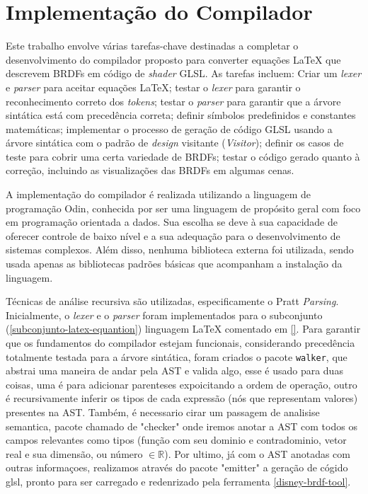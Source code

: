 \section{Implementação do Compilador} \label{compiladorimplementacao}
%
%


Este trabalho envolve várias tarefas-chave destinadas a completar o desenvolvimento do compilador proposto para converter equações \LaTeX{}  que descrevem BRDFs em código de \textit{shader} GLSL. As tarefas incluem: Criar um \textit{lexer} e \textit{parser} para aceitar equações \LaTeX{}; testar o \textit{lexer} para garantir o reconhecimento correto dos \textit{tokens}; testar o \textit{parser} para garantir que a árvore sintática está com precedência correta; definir símbolos predefinidos e constantes matemáticas; implementar o processo de geração de código GLSL usando a árvore sintática com o padrão de \textit{design} visitante (\textit{Visitor}); definir os casos de teste para cobrir uma certa variedade de BRDFs; testar o código gerado quanto à correção, incluindo as visualizações das BRDFs em algumas cenas.

A implementação do compilador é realizada utilizando a linguagem de programação Odin, conhecida por ser uma linguagem de propósito geral com foco em programação orientada a dados. Sua escolha se deve à sua capacidade de oferecer controle de baixo nível e a sua adequação para o desenvolvimento de sistemas complexos. Além disso, nenhuma biblioteca externa foi utilizada, sendo usada apenas as bibliotecas padrões básicas que acompanham a instalação da linguagem.

Técnicas de análise recursiva são utilizadas, especificamente o Pratt \textit{Parsing}. Inicialmente, o \textit{lexer} e o \textit{parser} foram implementados para o subconjunto (\autoref{subconjunto-latex-equantion}) linguagem \LaTeX{} comentado em \autoref{}. Para garantir que os fundamentos do compilador estejam funcionais, considerando precedência totalmente testada para a árvore sintática, foram criados o pacote \texttt{walker}, que abstrai uma maneira de andar pela AST e valida algo, esse é usado para duas coisas, uma é para adicionar parenteses expoicitando a ordem de operação, outro é recursivamente inferir os tipos de cada expressão (nós que representam valores) presentes na AST. 
Também, é necessario cirar um passagem de analisise semantica, pacote chamado de "checker" onde iremos anotar a AST com todos os campos relevantes como tipos (função com seu dominio e contradominio, vetor real e sua dimensão, ou número $\in \mathbb{R} $). Por ultimo, já com o AST anotadas com outras informaçoes, realizamos através do pacote "emitter" a geração de cógido glsl, pronto para ser carregado e redenrizado pela ferramenta \autoref{disney-brdf-tool}.

